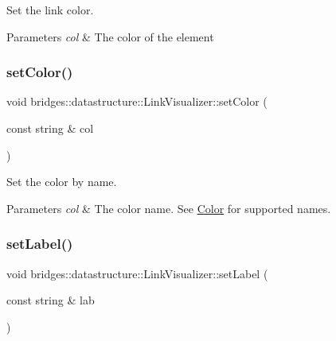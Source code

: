 Set the link color. 


\begin{DoxyParams}{Parameters}
{\em col} & The color of the element \\
\hline
\end{DoxyParams}
\mbox{\label{classbridges_1_1datastructure_1_1_link_visualizer_af570ade2d50a8789db3b06b79e5dc589}} 
\subsubsection{\texorpdfstring{setColor()}{setColor()}\hspace{0.1cm}{\footnotesize\ttfamily [2/2]}}
{\footnotesize\ttfamily void bridges\+::datastructure\+::\+Link\+Visualizer\+::set\+Color (\begin{DoxyParamCaption}\item[{const string \&}]{col }\end{DoxyParamCaption})\hspace{0.3cm}{\ttfamily [inline]}}



Set the color by name. 


\begin{DoxyParams}{Parameters}
{\em col} & The color name. See \mbox{\hyperlink{classbridges_1_1datastructure_1_1_color}{Color}} for supported names. \\
\hline
\end{DoxyParams}
\mbox{\label{classbridges_1_1datastructure_1_1_link_visualizer_a20ed50bf0e02f79dda0cb54c3af722fe}} 
\subsubsection{\texorpdfstring{setLabel()}{setLabel()}}
{\footnotesize\ttfamily void bridges\+::datastructure\+::\+Link\+Visualizer\+::set\+Label (\begin{DoxyParamCaption}\item[{const string \&}]{lab }\end{DoxyParamCaption})\hspace{0.3cm}{\ttfamily [inline]}}




